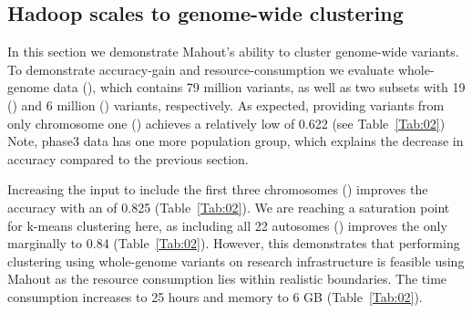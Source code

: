 \documentclass{bioinfo}
\begin{document}
\subsection*{Hadoop scales to genome-wide clustering}

In this section we demonstrate Mahout's ability to cluster genome-wide variants. 
To demonstrate accuracy-gain and resource-consumption we evaluate whole-genome data (\FullPhasethree{}), which contains 79 million variants, as well as two subsets with 19 (\ThreePhasethree{}) and 6 million (\OnePhasethree{}) variants, respectively.  
As expected, providing variants from only chromosome one (\OnePhasethree{}) achieves a relatively low \ARI{} of 0.622 (see Table~\ref{Tab:02})
Note, phase3 data has one more population group, which explains the decrease in accuracy compared to the previous section.  

Increasing the input to include the first three chromosomes (\ThreePhasethree{}) improves the accuracy with an \ARI{} of 0.825 (Table~\ref{Tab:02}).
We are reaching a saturation point for k-means clustering here, as including all 22 autosomes (\FullPhasethree{}) improves the \ARI{} only marginally to 0.84 (Table~\ref{Tab:02}).
However, this demonstrates that performing clustering using whole-genome variants on research infrastructure is feasible using Mahout as the resource consumption lies within realistic boundaries. The time consumption increases to 25 hours and memory to 6 GB (Table~\ref{Tab:02}). 


\end{document}
